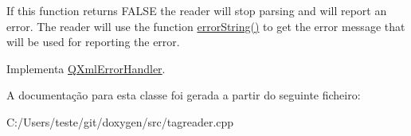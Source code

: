 If this function returns F\-A\-L\-S\-E the reader will stop parsing and will report an error. The reader will use the function \hyperlink{class_tag_file_error_handler_af799a7684337babb971e2e0d8cda7cf1}{error\-String()} to get the error message that will be used for reporting the error. 

Implementa \hyperlink{class_q_xml_error_handler_a109de9b8833092a63f6bc48f84cf241b}{Q\-Xml\-Error\-Handler}.



A documentação para esta classe foi gerada a partir do seguinte ficheiro\-:\begin{DoxyCompactItemize}
\item 
C\-:/\-Users/teste/git/doxygen/src/tagreader.\-cpp\end{DoxyCompactItemize}
